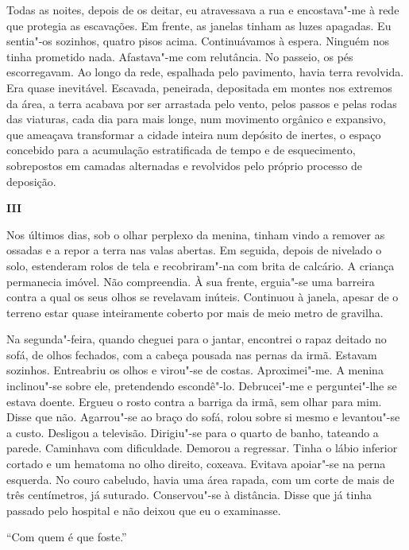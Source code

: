 Todas as noites, depois de os deitar, eu atravessava a rua e
encostava"-me à rede que protegia as escavações. Em frente, as janelas
tinham as luzes apagadas. Eu sentia"-os sozinhos, quatro pisos acima.
Continuávamos à espera. Ninguém nos tinha prometido nada. Afastava"-me
com relutância. No passeio, os pés escorregavam. Ao longo da rede,
espalhada pelo pavimento, havia terra revolvida. Era quase inevitável.
Escavada, peneirada, depositada em montes nos extremos da área, a terra
acabava por ser arrastada pelo vento, pelos passos e pelas rodas das
viaturas, cada dia para mais longe, num movimento orgânico e expansivo,
que ameaçava transformar a cidade inteira num depósito de inertes, o
espaço concebido para a acumulação estratificada de tempo e de
esquecimento, sobrepostos em camadas alternadas e revolvidos pelo
próprio processo de deposição.

\vspace*{1.8cm}
\noindent{}\textbf{III}

\bigskip

Nos últimos dias, sob o olhar perplexo da menina, tinham vindo a remover
as ossadas e a repor a terra nas valas abertas. Em seguida, depois de
nivelado o solo, estenderam rolos de tela e recobriram"-na com brita de
calcário. A criança permanecia imóvel. Não compreendia. À sua frente,
erguia"-se uma barreira contra a qual os seus olhos se revelavam
inúteis. Continuou à janela, apesar de o terreno estar quase
inteiramente coberto por mais de meio metro de gravilha.

Na segunda"-feira, quando cheguei para o jantar, encontrei o rapaz
deitado no sofá, de olhos fechados, com a cabeça pousada nas pernas da
irmã. Estavam sozinhos. Entreabriu os olhos e virou"-se de costas.
Aproximei"-me. A menina inclinou"-se sobre ele, pretendendo escondê"-lo.
Debrucei"-me e perguntei"-lhe se estava doente. Ergueu o rosto contra a
barriga da irmã, sem olhar para mim. Disse que não. Agarrou"-se ao braço
do sofá, rolou sobre si mesmo e levantou"-se a custo. Desligou a
televisão. Dirigiu"-se para o quarto de banho, tateando a parede.
Caminhava com dificuldade. Demorou a regressar. Tinha o lábio inferior
cortado e um hematoma no olho direito, coxeava. Evitava apoiar"-se na
perna esquerda. No couro cabeludo, havia uma área rapada, com um corte
de mais de três centímetros, já suturado. Conservou"-se à distância.
Disse que já tinha passado pelo hospital e não deixou que eu o
examinasse.

``Com quem é que foste.''

